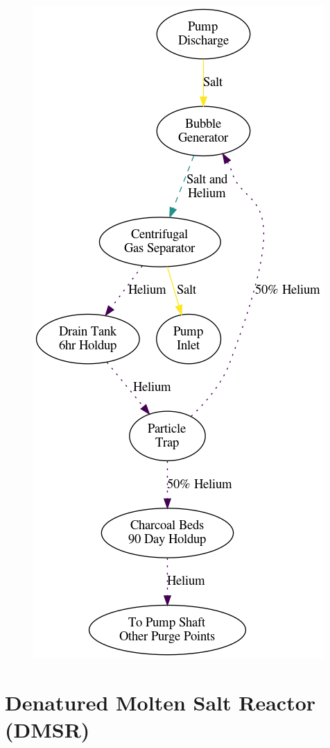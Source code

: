 \documentclass[letterpaper]{article}
\begin{document}
\begin{figure}[H]
\end{figure}\begin{figure}[H]
  \centering
  \includegraphics[height=.5\textheight]{figures/msdr-offgas.png}
  \label{fig:figF}
\end{figure}

\section{Denatured Molten Salt Reactor (DMSR)}
\end{document}
